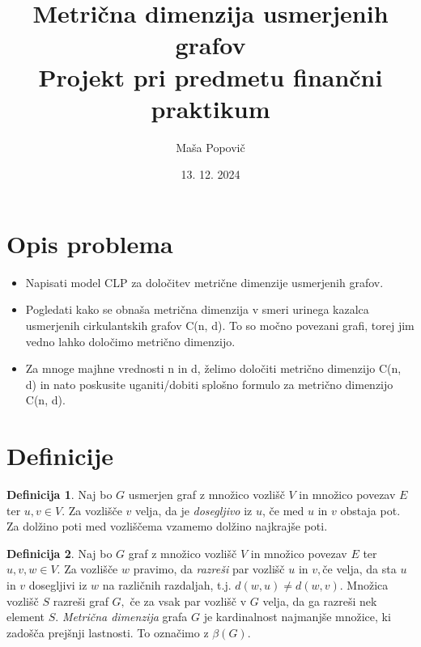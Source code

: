 \documentclass[a4paper,12pt]{article}
\title{
  Metrična dimenzija usmerjenih grafov \\
  \large Projekt pri predmetu finančni praktikum\\}
\author{Maša Popovič}
\date{\small 13. 12. 2024}
\theoremstyle{definition}
\newtheorem{definicija}{Definicija}[section]
\theoremstyle{remark}
\theoremstyle{definition}
\begin{document}
\maketitle

\section*{Opis problema}

\begin{itemize}
    \item Napisati model CLP za določitev metrične dimenzije usmerjenih grafov.
    \item Pogledati kako se obnaša metrična dimenzija v smeri urinega kazalca usmerjenih cirkulantskih grafov C(n, d). To so močno povezani grafi, torej jim vedno lahko določimo metrično dimenzijo.
    \item Za mnoge majhne vrednosti n in d, želimo določiti metrično dimenzijo C(n, d) in nato poskusite uganiti/dobiti splošno formulo za metrično dimenzijo C(n, d).
\end{itemize}
 
\section*{Definicije}

\begin{definicija}
    Naj bo $G$ usmerjen graf z množico vozlišč $V$ in 
    množico povezav $E$ ter $u,v \in V.$ Za vozlišče $v$ velja, da je \textit{dosegljivo}
    iz $u$, če med $u$ in $v$ obstaja pot. Za dolžino poti med vozliščema vzamemo dolžino
    najkrajše poti.
    \\
\end{definicija}

\par

\begin{definicija}
    Naj bo $G$ graf z množico vozlišč $V$ in množico povezav $E$ ter $u,v,w \in V.$ Za vozlišče 
    $w$ pravimo, da \textit{razreši} par vozlišč $u$ in $v,$če velja, da sta $u$ in $v$ dosegljivi
    iz $w$ na različnih razdaljah, t.j. $d(w,u) \neq d(w,v).$ Množica vozlišč $S$ razreši graf $G,$ če 
    za vsak par vozlišč v $G$ velja, da ga razreši nek element $S.$ \textit{Metrična dimenzija} grafa $G$
    je kardinalnost najmanjše množice, ki zadošča prejšnji lastnosti. To označimo z $\beta(G).$
    \\
\end{definicija}
\end{document}
